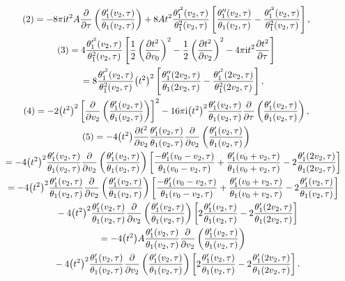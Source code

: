 \documentclass[pdftex]{sigma}%
\numberwithin{equation}{section}
\begin{document}
\begin{gather*}
(2)=-8\pi {\rm i}t^2A\frac{\partial}{\partial \tau}\left(\frac{\theta_1^{\prime}(v_2,\tau)}{\theta_1(v_2,\tau)}\right) +8At^2\frac{\theta_1^{\prime^2}(v_2,\tau)}{\theta_1^2(v_2,\tau)} \left[\frac{\theta_1^{\prime\prime}(v_2,\tau)}{\theta_1(v_2,\tau)} -\frac{\theta_1^{\prime^2}(v_2,\tau)}{\theta_1^2(v_2,\tau)}\right],
\\
(3)=4\frac{\theta_1^{\prime^2}(v_2,\tau)}{\theta_1^2(v_2,\tau)}\left[ \frac{1}{2}\left(\frac{\partial t^2}{\partial v_0}\right)^2- \frac{1}{2}\left(\frac{\partial t^2}{\partial v_2}\right)^2-4\pi {\rm i}t^2\frac{\partial t^2}{\partial \tau}\right]
\\ \hphantom{(3)}
=8\frac{\theta_1^{\prime^2}(v_2,\tau)}{\theta_1^2(v_2,\tau)}\big(t^2\big)^2 \left[\frac{\theta_1^{\prime\prime}(2v_2,\tau)}{\theta_1(2v_2,\tau)} -\frac{\theta_1^{\prime^2}(2v_2,\tau)}{\theta_1^2(2v_2,\tau)}\right],
\\
(4)=-2\big(t^2\big)^2\left[\frac{\partial}{\partial v_2}\left(\frac{\theta_1^{\prime}(v_2,\tau)}{\theta_1(v_2,\tau)}\right)\right]^2-16\pi {\rm i}\big(t^2\big)^2\frac{\theta_1^{\prime}(v_2,\tau)}{\theta_1(v_2,\tau)}\frac{\partial}{\partial \tau}\left(\frac{\theta_1^{\prime}(v_2,\tau)}{\theta_1(v_2,\tau)}\right),
\\
(5)=-4\big(t^2\big)\frac{\partial t^2} {\partial v_2}\frac{\theta_1^{\prime}(v_2,\tau)}{\theta_1(v_2,\tau)}\frac{\partial}{\partial v_2}\left(\frac{\theta_1^{\prime}(v_2,\tau)}{\theta_1(v_2,\tau)}\right)
\\ \hphantom{(5)}
=-4\big(t^2\big)^2\frac{\theta_1^{\prime}(v_2,\tau)}{\theta_1(v_2,\tau)}\frac{\partial}{\partial v_2}\left(\frac{\theta_1^{\prime}(v_2,\tau)}{\theta_1(v_2,\tau)}\right)\left[ \frac{-\theta_1^{\prime}(v_0-v_2,\tau)}{\theta_1(v_0-v_2,\tau)} +\frac{\theta_1^{\prime}(v_0+v_2,\tau)}{\theta_1(v_0+v_2,\tau)} -2\frac{\theta_1^{\prime}(2v_2,\tau)}{\theta_1(2v_2,\tau)}\right]
\\ \hphantom{(5)}
=-4\big(t^2\big)^2\frac{\theta_1^{\prime}(v_2,\tau)}{\theta_1(v_2,\tau)}\frac{\partial}{\partial v_2}\left(\frac{\theta_1^{\prime}(v_2,\tau)}{\theta_1(v_2,\tau)}\right)\left[ \frac{-\theta_1^{\prime}(v_0-v_2,\tau)}{\theta_1(v_0-v_2,\tau)} +\frac{\theta_1^{\prime}(v_0+v_2,\tau)}{\theta_1(v_0+v_2,\tau)} -2\frac{\theta_1^{\prime}(v_2,\tau)}{\theta_1(v_2,\tau)}\right]
\\ \hphantom{(5)=}
-4\big(t^2\big)^2\frac{\theta_1^{\prime}(v_2,\tau)}{\theta_1(v_2,\tau)}\frac{\partial}{\partial v_2}\left(\frac{\theta_1^{\prime}(v_2,\tau)}{\theta_1(v_2,\tau)}\right)\left[ 2\frac{\theta_1^{\prime}(v_2,\tau)}{\theta_1(v_2,\tau)} -2\frac{\theta_1^{\prime}(2v_2,\tau)}{\theta_1(2v_2,\tau)}\right]
\\ \hphantom{(5)}
=-4\big(t^2\big)A\frac{\theta_1^{\prime}(v_2,\tau)}{\theta_1(v_2,\tau)}\frac{\partial}{\partial v_2}\left(\frac{\theta_1^{\prime}(v_2,\tau)}{\theta_1(v_2,\tau)}\right)
\\ \hphantom{(5)=}
-4\big(t^2\big)^2\frac{\theta_1^{\prime}(v_2,\tau)}{\theta_1(v_2,\tau)}\frac{\partial}{\partial v_2}\left(\frac{\theta_1^{\prime}(v_2,\tau)}{\theta_1(v_2,\tau)}\right)\left[ 2\frac{\theta_1^{\prime}(v_2,\tau)}{\theta_1(v_2,\tau)} -2\frac{\theta_1^{\prime}(2v_2,\tau)}{\theta_1(2v_2,\tau)}\right].
\end{gather*}
\end{document}
